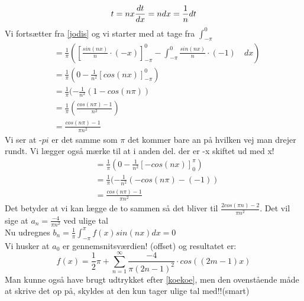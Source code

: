 \documentclass[11pt,fleqn]{book} %
\begin{document}
\begin{equation}
t=nx\\
\frac{dt}{dx}=n\\
dx=\frac{1}{n}dt
\end{equation}
Vi fortsætter fra \ref{jodis} og vi starter med at tage fra $\int_{-\pi}^{0}$
\begin{equation}
\begin{split}
&=  \frac{1}{\pi}(\left [ \frac{sin(nx)}{n} \cdot (-x) \right]_{-\pi}^0-\int_{-\pi}^{0}\frac{sin(nx)}{n} \cdot (-1)\quad dx)\\
&= \frac{1}{\pi}(0- \frac{1}{n^2}\left[cos(nx) \right]_{-\pi}^{0})\\
&=\frac{1}{\pi}(-\frac{1}{n^2}(1-cos(n \pi))\\
&= \frac{1}{\pi}(\frac{cos(n \pi)-1}{n^2})\\
&= \frac{cos(n \pi)-1}{\pi n^2}
\end{split}
\end{equation}
Vi ser at -$pi$ er det samme som $\pi$ det kommer bare an på hvilken vej man drejer rundt. Vi lægger også mærke til at i anden del. der er -x skiftet ud med x!
\begin{equation}\label{koekoe}
\begin{split}
&= \frac{1}{\pi}(0-\frac{1}{n^2}\left [-cos(nx) \right ]_0^{\pi} )\\
&= \frac{1}{\pi}(-\frac{1}{n^2}(-cos(n \pi)-(-1))\\
&= \frac{cos(n \pi)-1}{\pi n^2}
\end{split}
\end{equation}
Det betyder at vi kan lægge de to sammen så det bliver til $\frac{2cos( \pi n )-2}{\pi n^2}$. Det vil sige at $a_n=\frac{-4}{\pi n^2}$  ved ulige tal\\
Nu udregnes $b_n=\frac{1}{\pi}\int_{-\pi}^{\pi}f(x)sin(nx) dx=0$\\
Vi husker at $a_0$ er gennemsnitsværdien! (offset) og resultatet er:\\
\begin{equation}
f(x)=\frac{1}{2}\pi+\sum_{n=1}^{\infty}\frac{-4}{\pi (2n-1)^2}\cdot cos((2m-1)x)
\end{equation}
Man kunne også have brugt udtrykket efter \ref{koekoe}, men den ovenstående måde at skrive det op på, skyldes at den kun tager ulige tal med!!(smart)
\end{document}
